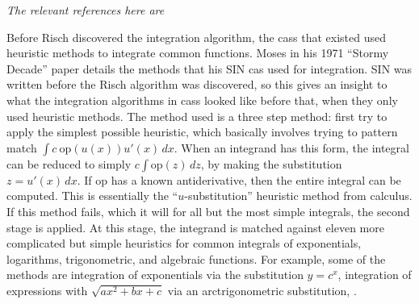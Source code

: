 \emph{The relevant references here
are~\cite{moses1971symbolic,risch1969problem}}

Before Risch discovered the \gls{integration} algorithm, the \glspl{cas}
that existed used heuristic methods to integrate common functions. Moses
in his 1971 ``Stormy Decade'' paper \cite{moses1971symbolic} details the
methods that his SIN \gls{cas} used for integration. SIN was written
before the Risch algorithm was discovered, so this gives an insight to
what the integration algorithms in \glspl{cas} looked like before that,
when they only used heuristic methods.  The method used is a three step
method: first try to apply the simplest possible heuristic, which
basically involves trying to pattern match $\int{c\
\mathrm{op}(u(x))u'(x)\,dx}$.  When an \gls{integrand} has this form,
the integral can be reduced to simply $c\int{\mathrm{op}(z)\,dz}$, by
making the substitution $z=u'(x)\,dx$.  If $\mathrm{op}$ has a known
antiderivative, then the entire integral can be computed.  This is
essentially the ``$u$-substitution'' heuristic method from calculus.  If
this method fails, which it will for all but the most simple integrals,
the second stage is applied.  At this stage, the \gls{integrand} is
matched against eleven more complicated but simple heuristics for common
integrals of exponentials, logarithms, trigonometric, and algebraic
functions.  For example, some of the methods are integration of
exponentials via the substitution $y=c^x$, integration of expressions
with $\sqrt{ax^2 + bx + c}$ via an arc\-trig\-o\-no\-met\-ric
substitution, .
